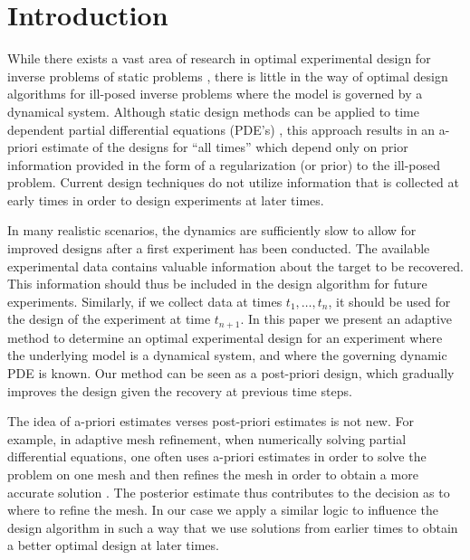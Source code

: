 \documentclass[leqno,onefignum,onetabnum]{siamltexmm}
\begin{document}
\pagestyle{myheadings}
\thispagestyle{plain}


\section{Introduction}
While there exists a vast area of research in optimal experimental design for  inverse problems  of static problems \cite{Haber2011,Haber2008,Haber2010,Bardow2008,Chaloner1995,Curtis1999,Atkinson1992,Pukelsheim1993a,Ajo-Franklin2009,Fedorov1972}, there is little in the way of optimal design algorithms for ill-posed inverse problems where the model is governed by a dynamical system. Although static design methods can be applied to time dependent partial differential equations (PDE's) \cite{Alexanderian2014,Haber2011}, this approach results in an a-priori estimate of the designs for ``all times''  which depend only on prior information provided in the form of a regularization (or prior) to the ill-posed problem.  Current design techniques do not utilize information that is collected at early times in order
 to design experiments at later times.
 
 In many realistic scenarios, the dynamics are sufficiently slow to allow for improved designs after a first experiment has been conducted. The available experimental data contains valuable information about the target to be recovered. This information should thus be included in the design algorithm for future experiments. 
 Similarly, if we  collect data at times $t_{1},\ldots , t_{n}$, it should be used for the design of the experiment at time $t_{n+1}$.
 In this paper we present an adaptive method to determine an optimal experimental design for an experiment where the underlying model is a dynamical system, and  where the governing dynamic PDE is known.
 Our method can be seen as a post-priori design, which gradually improves the design given the recovery at previous time steps. 
  
 The idea of a-priori estimates verses post-priori  estimates is not new. For example, in adaptive mesh refinement, when numerically 
solving partial differential
equations, one often uses a-priori estimates in order to solve the problem on one mesh 
and then refines the mesh in order to obtain a more accurate solution \cite{MultiGrid}. The posterior estimate thus contributes to the decision as to where to refine the mesh. In our case we apply a similar logic to influence the design algorithm in such a way that we use solutions from earlier times to obtain a better optimal design at later times. 
\end{document}
